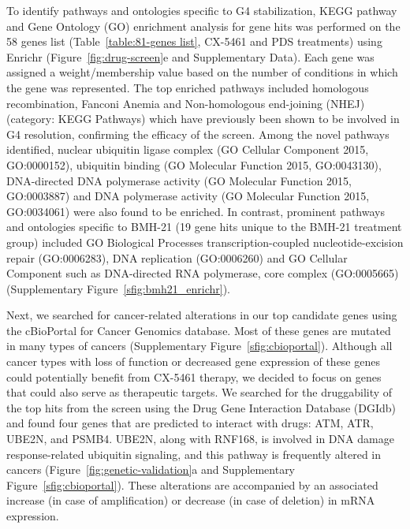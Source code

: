 To identify pathways and ontologies specific to G4 stabilization, KEGG pathway and Gene Ontology (GO) enrichment analysis for gene hits was performed on the 58 genes list (Table~\ref{table:81-genes list}, CX-5461 and PDS treatments) using Enrichr (Figure~\ref{fig:drug-screen}e and Supplementary Data)\cite{Chen2013,Kuleshov2016}. 
Each gene was assigned a weight/membership value based on the number of conditions in which the gene was represented. 
The top enriched pathways included homologous recombination, Fanconi Anemia  and Non-homologous end-joining (NHEJ) (category: KEGG Pathways) which have previously been shown to be involved in G4 resolution\cite{Sarkies2012,Piazza2010a,Paeschke2011a,Paeschke2013,Jimeno2018,Mendoza2016a,Eddy2014,Zimmer2015,Xu2017}, confirming the efficacy of the screen. 
Among the novel pathways identified, nuclear ubiquitin ligase complex (GO Cellular Component 2015, GO:0000152), ubiquitin binding (GO Molecular Function 2015, GO:0043130), DNA-directed DNA polymerase activity (GO Molecular Function 2015, GO:0003887) and DNA polymerase activity (GO Molecular Function 2015, GO:0034061) were also found to be enriched.
In contrast, prominent pathways and ontologies specific to BMH-21 (19 gene hits unique to the BMH-21 treatment group) included GO Biological Processes transcription-coupled nucleotide-excision repair (GO:0006283), DNA replication (GO:0006260) and GO Cellular Component such as DNA-directed RNA polymerase, core complex (GO:0005665) (Supplementary Figure~\ref{sfig:bmh21_enrichr}). 

Next, we searched for cancer-related alterations in our top candidate genes using the cBioPortal for Cancer Genomics database\cite{Cerami2012,Gao2013}. 
Most of these genes are mutated in many types of cancers (Supplementary Figure~\ref{sfig:cbioportal}). 
Although all cancer types with loss of function or decreased gene expression of these genes could potentially benefit from CX-5461 therapy, we decided to focus on genes that could also serve as therapeutic targets. 
We searched for the druggability of the top hits from the screen using the Drug Gene Interaction Database (DGIdb) and found four genes that are predicted to interact with drugs: ATM, ATR, UBE2N, and PSMB4. 
UBE2N, along with RNF168, is involved in DNA damage response-related ubiquitin signaling, and this pathway is frequently altered in cancers (Figure~\ref{fig:genetic-validation}a and Supplementary Figure~\ref{sfig:cbioportal}). 
These alterations are accompanied by an associated increase (in case of amplification) or decrease (in case of deletion) in mRNA expression.

